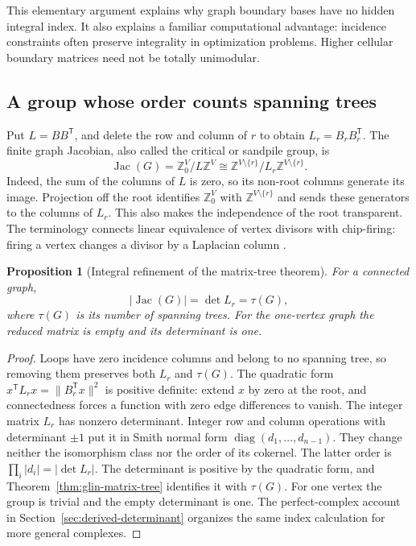\documentclass[11pt]{article}
\newtheorem{proposition}[theorem]{Proposition}
\theoremstyle{definition}
\theoremstyle{remark}
\newcommand{\Z}{\mathbb Z}
\begin{document}
This elementary argument explains why graph boundary bases have no hidden
integral index.  It also explains a familiar computational advantage:
incidence constraints often preserve integrality in optimization problems.
Higher cellular boundary matrices need not be totally unimodular.

\subsection{A group whose order counts spanning trees}

Put \(L=BB^{\mathsf T}\), and delete the row and column of \(r\) to obtain
\(L_r=B_rB_r^{\mathsf T}\).  The finite graph Jacobian, also called the
critical or sandpile group, is
\[
 \operatorname{Jac}(G)=\Z^V_0/L\Z^V
       \cong\Z^{V\setminus\{r\}}/L_r\Z^{V\setminus\{r\}}.
\]
Indeed, the sum of the columns of \(L\) is zero, so its non-root columns
generate its image.  Projection off the root identifies \(\Z^V_0\) with
\(\Z^{V\setminus\{r\}}\) and sends these generators to the columns of
\(L_r\).  This also makes the independence of the root transparent.
The terminology connects linear equivalence of vertex divisors with
chip-firing: firing a vertex changes a divisor by a Laplacian column
\cite{gih-levine-tree}.

\begin{proposition}[Integral refinement of the matrix-tree theorem]
For a connected graph,
\[
 |\operatorname{Jac}(G)|=\det L_r=\tau(G),
\]
where \(\tau(G)\) is its number of spanning trees.  For the one-vertex
graph the reduced matrix is empty and its determinant is one.
\end{proposition}
\begin{proof}
Loops have zero incidence columns and belong to no spanning tree, so
removing them preserves both $L_r$ and $\tau(G)$.
The quadratic form $x^{\mathsf T}L_rx=\|B_r^{\mathsf T}x\|^2$ is positive
definite: extend $x$ by zero at the root, and connectedness forces a
function with zero edge differences to vanish. The integer matrix $L_r$ has nonzero determinant. Integer row and column
operations with determinant $\pm1$ put it in Smith normal form
$\operatorname{diag}(d_1,\ldots,d_{n-1})$. They change neither the isomorphism
class nor the order of its cokernel. The latter order is
$\prod_i|d_i|=|\det L_r|$. The determinant is positive by the quadratic form,
and Theorem~\ref{thm:glin-matrix-tree} identifies it with $\tau(G)$.
For one vertex the group is trivial and the empty determinant is one.
The perfect-complex account in Section~\ref{sec:derived-determinant}
organizes the same index calculation for more general complexes.
\end{proof}
\end{document}
